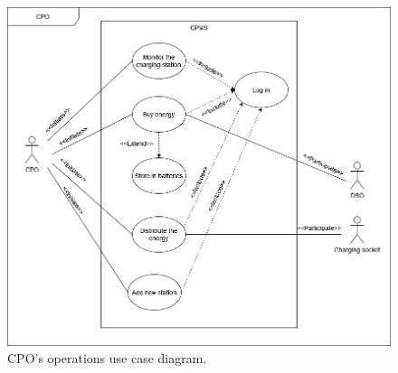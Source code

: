 \begin{figure}[H]
    \centering
    \includegraphics[width=\textwidth]{images/uc_CPO.png}
    \caption{CPO's operations use case diagram.}
    \label{fig:uc_cpo}
\end{figure}
